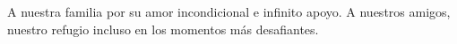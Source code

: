 \begin{dedication}
    A nuestra familia por su amor incondicional e infinito apoyo. A nuestros amigos,
    nuestro refugio incluso en los momentos más desafiantes.
\end{dedication}